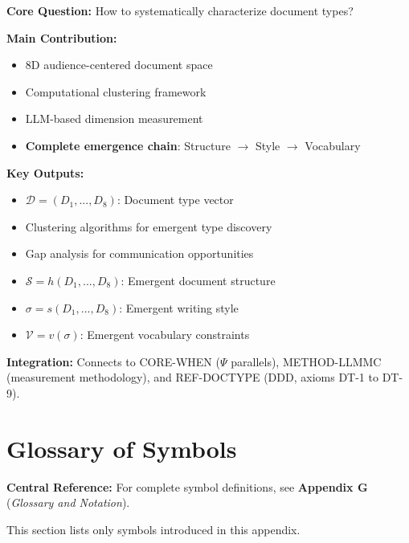 \begin{tcolorbox}[colback=green!10!white, colframe=green!75!black,
    title=\textbf{Appendix CCC: Summary}]

\textbf{Core Question:} How to systematically characterize document types?

\textbf{Main Contribution:}
\begin{itemize}[nosep]
    \item 8D audience-centered document space
    \item Computational clustering framework
    \item LLM-based dimension measurement
    \item \textbf{Complete emergence chain}: Structure $\to$ Style $\to$ Vocabulary
\end{itemize}

\textbf{Key Outputs:}
\begin{itemize}[nosep]
    \item $\mathcal{D} = (D_1, ..., D_8)$: Document type vector
    \item Clustering algorithms for emergent type discovery
    \item Gap analysis for communication opportunities
    \item $\mathcal{S} = h(D_1, ..., D_8)$: Emergent document structure
    \item $\sigma = s(D_1, ..., D_8)$: Emergent writing style
    \item $\mathcal{V} = v(\sigma)$: Emergent vocabulary constraints
\end{itemize}

\textbf{Integration:} Connects to CORE-WHEN ($\Psi$ parallels),
METHOD-LLMMC (measurement methodology), and REF-DOCTYPE (DDD, axioms DT-1 to DT-9).

\end{tcolorbox}


\section{Glossary of Symbols}
\label{sec:doctype-glossary}

\begin{tcolorbox}[colback=blue!5!white, colframe=blue!75!black]
\textbf{Central Reference:} For complete symbol definitions, see
\textbf{Appendix G} (\textit{Glossary and Notation}).

This section lists only symbols introduced in this appendix.
\end{tcolorbox}

